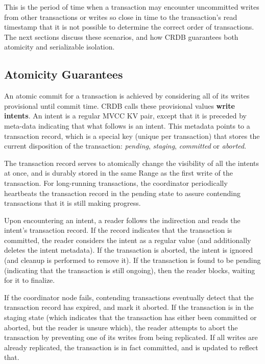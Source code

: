 \documentclass[11pt]{article}
\begin{document}
This is the period of time when a transaction may encounter uncommitted writes from other transactions
or writes so close in time to the transaction's read timestamp that it is not possible to determine
the correct order of transactions. The next sections discuss these scenarios, and how CRDB
guarantees both atomicity and serializable isolation.
\subsection{Atomicity Guarantees}
\label{sec:org4ee49c3}
An atomic commit for a transaction is achieved by considering all of its writes provisional until
commit time. CRDB calls these provisional values \textbf{write intents}. An intent is a regular MVCC KV pair,
except that it is preceded by meta-data indicating that what follows is an intent. This metadata
points to a transaction record, which is a special key (unique per transaction) that stores the
current disposition of the transaction: \emph{pending}, \emph{staging}, \emph{committed} or \emph{aborted}.

The transaction record serves to atomically change the visibility of all the intents at once, and is
durably stored in the same Range as the first write of the transaction. For long-running transactions,
the coordinator periodically heartbeats the transaction record in the pending state to assure
contending transactions that it is still making progress.

Upon encountering an intent, a reader follows the indirection and reads the intent's transaction
record. If the record indicates that the transaction is committed, the reader considers the intent as
a regular value (and additionally deletes the intent metadata). If the transaction is aborted, the
intent is ignored (and cleanup is performed to remove it). If the transaction is found to be pending
(indicating that the transaction is still ongoing), then the reader blocks, waiting for it to
finalize.

If the coordinator node fails, contending transactions eventually detect that the
transaction record has expired, and mark it aborted. If the transaction is in the staging state (which
indicates that the transaction has either been committed or aborted, but the reader is unsure which),
the reader attempts to abort the transaction by preventing one of its writes from being replicated. If
all writes are already replicated, the transaction is in fact committed, and is updated to reflect
that.
\end{document}

